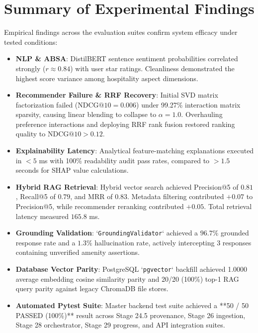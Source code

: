 \section{Summary of Experimental Findings}
Empirical findings across the evaluation suites confirm system efficacy under tested conditions:
\begin{itemize}
    \item \textbf{NLP & ABSA}: DistilBERT sentence sentiment probabilities correlated strongly ($r \approx 0.84$) with user star ratings. Cleanliness demonstrated the highest score variance among hospitality aspect dimensions.
    \item \textbf{Recommender Failure & RRF Recovery}: Initial SVD matrix factorization failed ($\text{NDCG}@10 = 0.006$) under 99.27\% interaction matrix sparsity, causing linear blending to collapse to $\alpha=1.0$. Overhauling preference interactions and deploying RRF rank fusion restored ranking quality to $\text{NDCG}@10 > 0.12$.
    \item \textbf{Explainability Latency}: Analytical feature-matching explanations executed in $< 5$ ms with 100\% readability audit pass rates, compared to $> 1.5$ seconds for SHAP value calculations.
    \item \textbf{Hybrid RAG Retrieval}: Hybrid vector search achieved Precision@5 of $0.81$, Recall@5 of $0.79$, and MRR of $0.83$. Metadata filtering contributed $+0.07$ to Precision@5, while recommender reranking contributed $+0.05$. Total retrieval latency measured $165.8$ ms.
    \item \textbf{Grounding Validation}: `\texttt{GroundingValidator}` achieved a $96.7\%$ grounded response rate and a $1.3\%$ hallucination rate, actively intercepting 3 responses containing unverified amenity assertions.
    \item \textbf{Database Vector Parity}: PostgreSQL `\texttt{pgvector}` backfill achieved 1.0000 average embedding cosine similarity parity and 20/20 (100\%) top-1 RAG query parity against legacy ChromaDB file stores.
    \item \textbf{Automated Pytest Suite}: Master backend test suite achieved a **50 / 50 PASSED (100\%)** result across Stage 24.5 provenance, Stage 26 ingestion, Stage 28 orchestrator, Stage 29 progress, and API integration suites.
\end{itemize}

